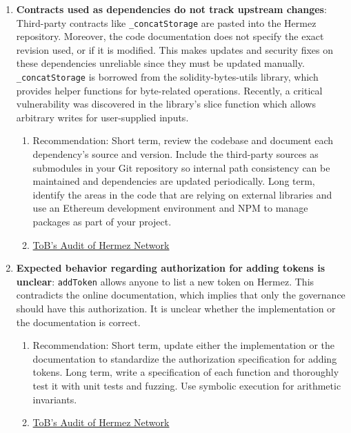 \begin{enumerate}
\item\textbf{Contracts used as dependencies do not track upstream changes}: Third-party contracts like \verb|_concatStorage| are pasted into the Hermez repository. Moreover, the code documentation does not specify the exact revision used, or if it is modified. This makes updates and security fixes on these dependencies unreliable since they must be updated manually. \verb|_concatStorage| is borrowed from the solidity-bytes-utils library, which provides helper functions for byte-related operations. Recently, a critical vulnerability was discovered in the library’s slice function which allows arbitrary writes for user-supplied inputs.
	\begin{enumerate}
	\item Recommendation: Short term, review the codebase and document each dependency’s source and version. Include the third-party sources as submodules in your Git repository so internal path consistency can be maintained and dependencies are updated periodically. Long term, identify the areas in the code that are relying on external libraries and use an Ethereum development environment and NPM to manage packages as part of your project.
	\item\href{https://github.com/trailofbits/publications/blob/master/reviews/hermez.pdf}{ToB's Audit of Hermez Network}
	\end{enumerate}

\item\textbf{Expected behavior regarding authorization for adding tokens is unclear}: \verb|addToken| allows anyone to list a new token on Hermez. This contradicts the online documentation, which implies that only the governance should have this authorization. It is unclear whether the implementation or the documentation is correct.
	\begin{enumerate}
	\item Recommendation: Short term, update either the implementation or the documentation to standardize the authorization specification for adding tokens. Long term, write a specification of each function and thoroughly test it with unit tests and fuzzing. Use symbolic execution for arithmetic invariants.
	\item\href{https://github.com/trailofbits/publications/blob/master/reviews/hermez.pdf}{ToB's Audit of Hermez Network}
	\end{enumerate}


\end{enumerate}
